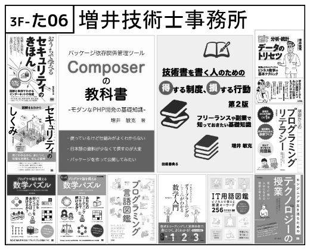 \begin{center}
\includegraphics[width=0.9\linewidth]{images/circle-appeals/3F-た06.jpg}

\end{center}
